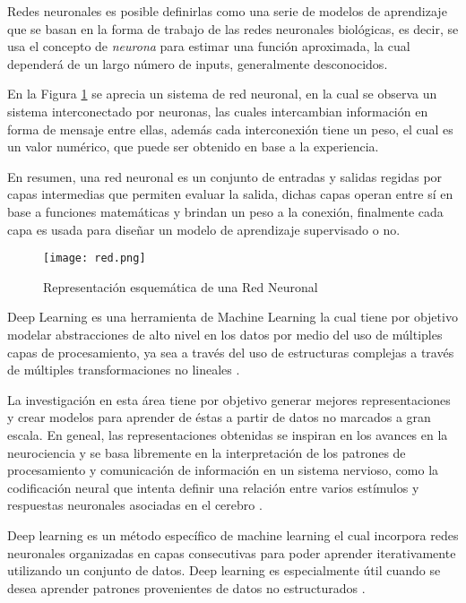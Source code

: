 Redes neuronales es posible definirlas como una serie de modelos de aprendizaje que se basan en la forma de trabajo de las redes neuronales biológicas, es decir, se usa el concepto de \textit{neurona} para estimar una función aproximada, la cual dependerá de un largo número de inputs, generalmente desconocidos.

En la Figura \ref{red} se aprecia un sistema de red neuronal, en la cual se observa un sistema interconectado por neuronas, las cuales intercambian información en forma de mensaje entre ellas, además cada interconexión tiene un peso, el cual es un valor numérico, que puede ser obtenido en base a la experiencia.

En resumen, una red neuronal es un conjunto de entradas y salidas regidas por capas intermedias que permiten evaluar la salida, dichas capas operan entre sí en base a funciones matemáticas y brindan un peso a la conexión, finalmente cada capa es usada para diseñar un modelo de aprendizaje supervisado o no.

\begin{figure}[!h]
	\centering
	\texttt{[image: red.png]}
	\caption{Representación esquemática de una Red Neuronal}
	\label{red}
\end{figure} 

Deep Learning es una herramienta de Machine Learning la cual tiene por objetivo modelar abstracciones de alto nivel en los datos por medio del uso de múltiples capas de procesamiento, ya sea a través del uso de estructuras complejas a través de múltiples transformaciones no lineales \cite{bengio2013representation, MAL-006, SIG-039}. 

La investigación en esta área tiene por objetivo generar mejores representaciones y crear modelos para aprender de éstas a partir de datos no marcados a gran escala. En geneal, las representaciones obtenidas se inspiran en los avances en la neurociencia y se basa libremente en la interpretación de los patrones de procesamiento y comunicación de información en un sistema nervioso, como la codificación neural que intenta definir una relación entre varios estímulos y respuestas neuronales asociadas en el cerebro \cite{MAL-006}.

Deep learning es un método específico de machine learning el cual incorpora redes neuronales organizadas en capas consecutivas para poder aprender iterativamente utilizando un conjunto de datos. Deep learning es especialmente útil cuando se desea aprender patrones provenientes de datos no estructurados \cite{SIG-039}.

